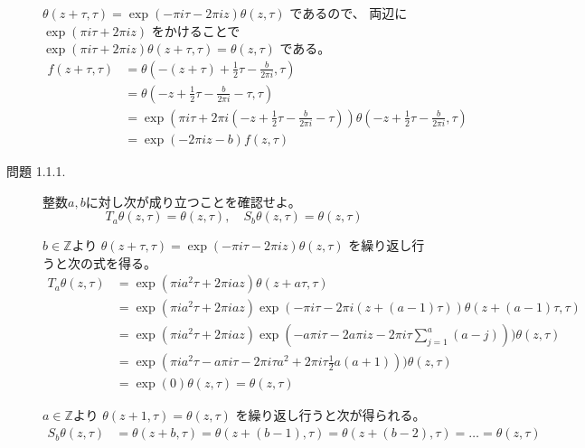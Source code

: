 \documentclass[12pt,b5paper]{ltjsarticle}
\begin{document}
\begin{description}
\begin{description}
             $\theta(z+\tau,\tau)=\exp{(-\pi i\tau-2\pi iz)}\theta(z,\tau)$
             であるので、
             両辺に
             $\exp{(\pi i\tau+2\pi iz)}$
             をかけることで
             $\exp{(\pi i\tau+2\pi iz)} \theta(z+\tau,\tau)=\theta(z,\tau)$
             である。
             \begin{align}
              f(z+\tau,\tau)
               &= \theta(-(z+\tau) +\frac{1}{2}\tau - \frac{b}{2\pi i},\tau)\\
               &= \theta(-z +\frac{1}{2}\tau - \frac{b}{2\pi i} -\tau,\tau)\\
               &= \exp{(\pi i\tau+2\pi i(-z +\frac{1}{2}\tau - \frac{b}{2\pi i} -\tau))} \theta(-z +\frac{1}{2}\tau - \frac{b}{2\pi i},\tau)\\
              &= \exp{(-2\pi iz   -b)} f(z,\tau)
             \end{align}

\hrulefill

  \item[問題 1.1.1.]
             整数$a,b$に対し次が成り立つことを確認せよ。
             \begin{equation}
              T_{a}\theta(z,\tau)
               =\theta(z,\tau)
               ,\quad
               S_{b}\theta(z,\tau)
               =\theta(z,\tau)
             \end{equation}

\dotfill

             $b\in\mathbb{Z}$より
             $\theta(z+\tau,\tau)=\exp{(-\pi i\tau-2\pi iz)\theta(z,\tau)}$
             を繰り返し行うと次の式を得る。
             \begin{align}
              T_{a}\theta(z,\tau)
              &= \exp{(\pi i a^{2}\tau + 2\pi i a z)} \theta(z+a\tau,\tau)\\
              &= \exp{(\pi i a^{2}\tau + 2\pi i a z)} \exp{(-\pi i\tau-2\pi i(z+(a-1)\tau))}\theta(z+(a-1)\tau,\tau)\\
              &= \exp{(\pi i a^{2}\tau + 2\pi i a z)}
              \exp{(-a\pi i\tau-2a\pi iz- 2\pi i\tau \sum_{j=1}^{a}(a-j)))}\theta(z,\tau)\\
              &= \exp{(\pi i a^{2}\tau
              -a\pi i\tau - 2\pi i\tau a^{2} +2\pi i \tau \frac{1}{2}a(a+1)))}\theta(z,\tau)\\
              &= \exp{(0)}\theta(z,\tau) = \theta(z,\tau)
             \end{align}


             $a\in\mathbb{Z}$より
             $\theta(z+1,\tau)=\theta(z,\tau)$
             を繰り返し行うと次が得られる。
             \begin{align}
              S_{b}\theta(z,\tau)
              &= \theta(z+b,\tau)
              = \theta(z+(b-1),\tau)
              = \theta(z+(b-2),\tau)
              = \dots = \theta(z,\tau)
             \end{align}


\end{description}
\end{description}
\end{document}
